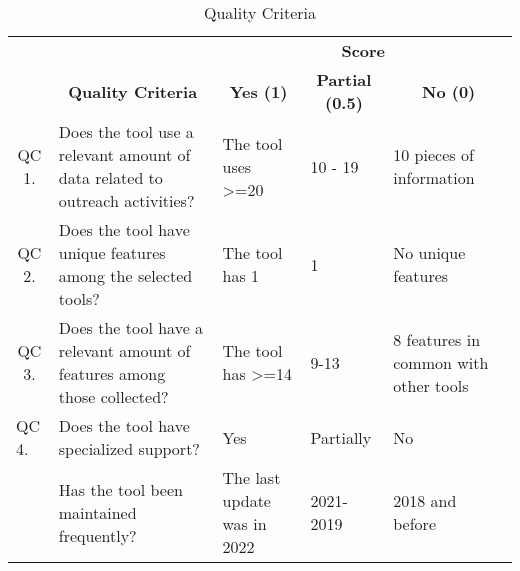 \begin{table}[!htb]
  \centering
  \caption{Quality Criteria}
  \label{tbl:gl-quality-criteria}
  \footnotesize
  \begin{tabular}{c|p{4.2cm}|p{3cm}|p{2.5cm}|p{3cm}}
    \bottomrule
    \rowcolor[rgb]{0.753,0.753,0.753} {\cellcolor[rgb]{0.753,0.753,0.753}}                              & \multicolumn{1}{c|}{{\cellcolor[rgb]{0.753,0.753,0.753}}}                                            & \multicolumn{3}{c}{\textbf{\textbf{Score}}}                                                                                       \\
    \hhline{>{\arrayrulecolor[rgb]{0.753,0.753,0.753}}-->{\arrayrulecolor{black}}---}
    \rowcolor[rgb]{0.753,0.753,0.753} \multirow{-2}{*}{{\cellcolor[rgb]{0.753,0.753,0.753}}\textbf{ID}} & \multicolumn{1}{c|}{\multirow{-2}{*}{{\cellcolor[rgb]{0.753,0.753,0.753}}\textbf{Quality Criteria}}} & \multicolumn{1}{c|}{\textbf{Yes (1)}}       & \multicolumn{1}{c|}{\textbf{Partial (0.5)}} & \multicolumn{1}{c}{\textbf{No (0)}}   \\
    \hline
    \rowcolor[rgb]{0.898,0.898,0.898} QC 1.                                                             & Does the tool use a relevant amount of data related to outreach activities?                          & The tool uses >=20                          & 10 - 19                                     & 10 pieces of information              \\
    QC 2.                                                                                               & Does the tool have unique features among the selected tools?                                         & The tool has 1                              & 1                                           & No unique features                    \\
    \rowcolor[rgb]{0.898,0.898,0.898} QC 3.                                                             & Does the tool have a relevant amount of features among those collected?                              & The tool has >=14                           & 9-13                                        & 8 features in common with other tools \\
    \multicolumn{1}{l|}{QC 4.}                                                                          & Does the tool have specialized support?                                                              & Yes                                         & Partially                                   & No                                    \\
    \rowcolor[rgb]{0.898,0.898,0.898} \multicolumn{1}{l|}{QC 5.}                                        & Has the tool been maintained frequently?                                                             & The last update was in 2022                 & 2021-2019                                   & 2018 and before                       \\
    \toprule
  \end{tabular}
\end{table}